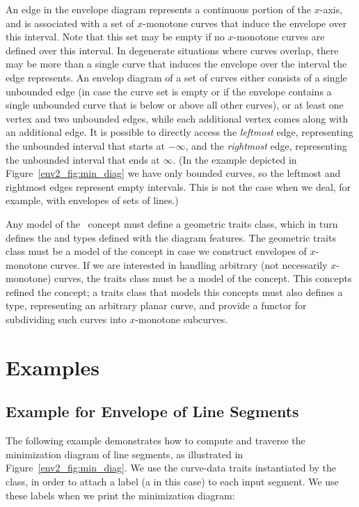 An edge in the envelope diagram represents a continuous portion of the
$x$-axis, and is associated with a set of $x$-monotone curves that
induce the envelope over this interval. Note that this set may be
empty if no $x$-monotone curves are defined over this interval. In
degenerate situations where curves overlap, there may be more than
a single curve that induces the envelope over the interval the edge
represents. An envelop diagram of a set of curves either consists of
a single unbounded edge (in case the curve set is empty or if the
envelope contains a single unbounded curve that is below or above
all other curves), or at least one vertex and two unbounded edges,
while each additional vertex comes along with an additional edge. It
is possible to directly access the {\em leftmost} edge, representing
the unbounded interval that starts at $-\infty$, and the {\em rightmost}
edge, representing the unbounded interval that ends at $\infty$.
(In the example depicted in Figure~\ref{env2_fig:min_diag} we have
only bounded curves, so the leftmost and rightmost edges represent
empty intervals. This is not the case when we deal, for example, with
envelopes of sets of lines.)

Any model of the \ccRefName\ concept must define a geometric
traits class, which in turn defines the  and 
 types defined with the diagram features.
The geometric traits class must be a model of the 
 concept in case we construct
envelopes of $x$-monotone curves. If we are interested in handling
arbitrary (not necessarily $x$-monotone) curves, the traits class
must be a model of the  concept. This
concepts refined the  concept;
a traits class that models this concepts must also defines a
 type, representing an arbitrary planar curve, and
provide a functor for subdividing such curves into $x$-monotone
subcurves.

\section{Examples}

\subsection{Example for Envelope of Line Segments}

The following example demonstrates how to compute and traverse the
minimization diagram of line segments, as illustrated in
Figure~\ref{env2_fig:min_diag}. We use the curve-data traits
instantiated by the  class, in order to
attach a label (a  in this case) to each input segment.
We use these labels when we print the minimization diagram:

